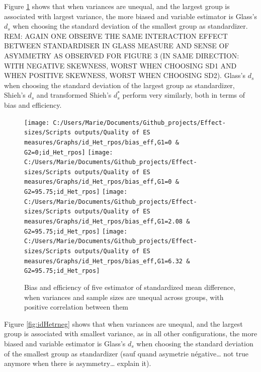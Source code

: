 \documentclass[
  man,floatsintext]{apa6}
\begin{document}
Figure \ref{fig:idHetrpos} shows that when variances are unequal, and the largest group is associated with largest variance, the more biased and variable estimator is Glass's \(d_s\) when choosing the standard deviation of the smallest group as standardizer.
REM: AGAIN ONE OBSERVE THE SAME INTERACTION EFFECT BETWEEN STANDARDISER IN GLASS MEASURE AND SENSE OF ASYMMETRY AS OBSERVED FOR FIGURE 3 (IN SAME DIRECTION: WITH NEGATIVE SKEWNESS, WORST WHEN CHOOSING SD1 AND WHEN POSITIVE SKEWNESS, WORST WHEN CHOOSING SD2). Glass's \(d_s\) when choosing the standard deviation of the largest group as standardizer, Shieh's \(d_s\) and transformed Shieh's \(d^*_s\) perform very similarly, both in terms of bias and efficiency.

\begin{figure}

{\centering \texttt{[image: C:/Users/Marie/Documents/Github\_projects/Effect-sizes/Scripts outputs/Quality of ES measures/Graphs/id\_Het\_rpos/bias\_eff,G1=0 \& G2=0;id\_Het\_rpos]} \texttt{[image: C:/Users/Marie/Documents/Github\_projects/Effect-sizes/Scripts outputs/Quality of ES measures/Graphs/id\_Het\_rpos/bias\_eff,G1=0 \& G2=95.75;id\_Het\_rpos]} \texttt{[image: C:/Users/Marie/Documents/Github\_projects/Effect-sizes/Scripts outputs/Quality of ES measures/Graphs/id\_Het\_rpos/bias\_eff,G1=2.08 \& G2=95.75;id\_Het\_rpos]} \texttt{[image: C:/Users/Marie/Documents/Github\_projects/Effect-sizes/Scripts outputs/Quality of ES measures/Graphs/id\_Het\_rpos/bias\_eff,G1=6.32 \& G2=95.75;id\_Het\_rpos]} 

}

\caption{Bias and efficiency of five estimator of standardized mean difference, when variances and sample sizes are unequal across groups, with positive correlation between them}\label{fig:idHetrpos}
\end{figure}

Figure \ref{fig:idHetrneg} shows that when variances are unequal, and the largest group is associated with smallest variance, as in all other configurations, the more biased and variable estimator is Glass's \(d_s\) when choosing the standard deviation of the smallest group as standardizer (sauf quand asymetrie négative\ldots{} not true anymore when there is asymmetry\ldots{} explain it).
\end{document}
